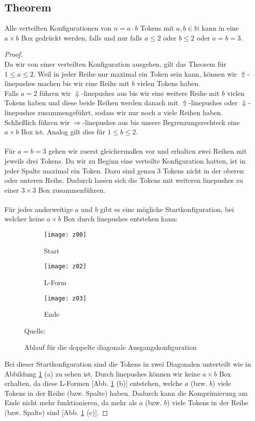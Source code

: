 \documentclass[seminar,german]{algothesis}
\newcommand*{\quelle}{%
  \footnotesize Quelle:
}
\begin{document}
\subsection{Theorem}
Alle verteilten Konfigurationen von $n=a\cdot b$ Tokens mit $a,b\in \mathbb{N}$ kann in eine $a \times b$ Box gedrückt werden, falls und nur falls $a\leq 2$ oder $b\leq 2$ oder $a=b=3$.
\begin{proof}\noindent\\
Da wir von einer verteilten Konfiguration ausgehen, gilt das Theorem für $1\leq a\leq 2$. Weil in jeder Reihe nur maximal ein Token sein kann, können wir $\Uparrow$-linepushes machen bis wir eine Reihe mit $b$ vielen Tokens haben. \\
Falls $a = 2$ führen wir $\Downarrow$-linepushes aus bis wir eine weitere Reihe mit $b$ vielen Tokens haben und diese beide Reihen werden danach mit $\Uparrow$-linepushes oder $\Downarrow$-linepushes zusammengeführt, sodass wir nur noch $a$  viele Reihen haben. Schließlich führen wir $\Rightarrow$-linepushes aus bis unsere Begrenzungsrechteck eine $a\times b$ Box ist. Analog gilt dies für $1\leq b\leq 2$.\\\\
Für $a=b=3$ gehen wir zuerst gleichermaßen vor und erhalten zwei Reihen mit jeweils drei Tokens. Da wir zu Beginn eine verteilte Konfiguration hatten, ist in jeder Spalte maximal ein Token. Dazu sind genau 3 Tokens nicht in der oberen oder unteren Reihe. Dadurch lassen sich die Tokens mit weiteren linepushes zu einer  $3\times 3$ Box zusammenführen. \\\\
Für jedes anderweitige $a$ und $b$ gibt es eine mögliche Startkonfiguration, bei welcher keine $a\times b$ Box durch linepushes entstehen kann:\\

\begin{figure}[ht]
	\centering
	\begin{subfigure}{.3\textwidth}
		\texttt{[image: z00]}
		\caption{Start}
    \end{subfigure}%
    \begin{subfigure}{.3\textwidth}
		\texttt{[image: z02]}
		\caption{L-Form}
    \end{subfigure}%
    \begin{subfigure}{.3\textwidth}
		\texttt{[image: z03]}
		\caption{Ende}
    \end{subfigure}%
    \caption{Ablauf für die doppelte diagonale Ausgangskonfiguration}
	\quelle \cite{akitaya2022pushing}
	\label{fig:13}
\end{figure}

\noindent
Bei dieser Startkonfiguration sind die Tokens in zwei Diagonalen unterteilt wie in Abbildung \ref{fig:13} (a) zu sehen ist. Durch linepushes können wir keine $a\times b$ Box erhalten, da diese L-Formen [Abb. \ref{fig:13} (b)] entstehen, welche $a$ (bzw. $b$) viele Tokens in der Reihe (bzw. Spalte) haben. Dadurch kann die Komprimierung am Ende nicht mehr funktionieren, da mehr als $a$ (bzw. $b$) viele Tokens in der Reihe (bzw. Spalte) sind [Abb. \ref{fig:13} (c)].
\end{proof}
\end{document}

